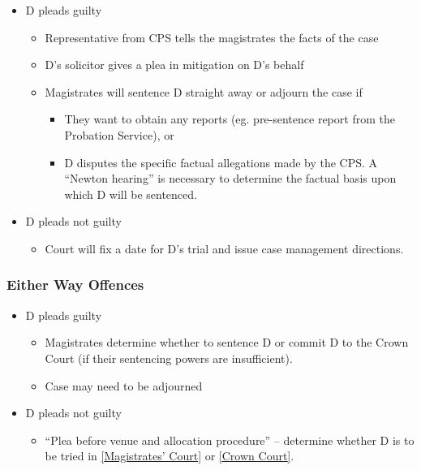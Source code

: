 \documentclass[
]{article}
\providecommand{\tightlist}{%
  \setlength{\itemsep}{0pt}\setlength{\parskip}{0pt}}
\begin{document}
\begin{itemize}
\tightlist
\item
  D pleads guilty

  \begin{itemize}
  \tightlist
  \item
    Representative from CPS tells the magistrates the facts of the case
  \item
    D's solicitor gives a plea in mitigation on D's behalf
  \item
    Magistrates will sentence D straight away or adjourn the case if

    \begin{itemize}
    \tightlist
    \item
      They want to obtain any reports (eg. pre-sentence report from the
      Probation Service), or
    \item
      D disputes the specific factual allegations made by the CPS. A
      ``Newton hearing'' is necessary to determine the factual basis
      upon which D will be sentenced.
    \end{itemize}
  \end{itemize}
\item
  D pleads not guilty

  \begin{itemize}
  \tightlist
  \item
    Court will fix a date for D's trial and issue case management
    directions.
  \end{itemize}
\end{itemize}

\hypertarget{either-way-offences}{%
\subsubsection{Either Way Offences}\label{either-way-offences}}

\begin{itemize}
\tightlist
\item
  D pleads guilty

  \begin{itemize}
  \tightlist
  \item
    Magistrates determine whether to sentence D or commit D to the Crown
    Court (if their sentencing powers are insufficient).
  \item
    Case may need to be adjourned
  \end{itemize}
\item
  D pleads not guilty

  \begin{itemize}
  \tightlist
  \item
    ``Plea before venue and allocation procedure'' -- determine whether
    D is to be tried in
    \href{maximum\%20compensation\%20of\%20£5,000\%20per\%20offence}{{[}Magistrates'
    Court{]}} or \href{no\%20financial\%20limit.}{{[}Crown Court{]}}.
  \end{itemize}
\end{itemize}
\end{document}
